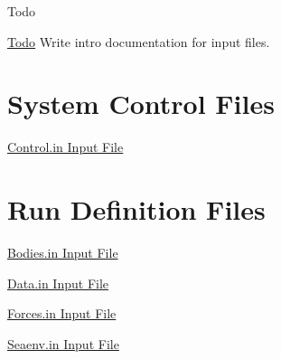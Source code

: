 \begin{DoxyRefDesc}{Todo}
\item[\hyperlink{todo__todo000012}{Todo}]Write intro documentation for input files.\end{DoxyRefDesc}


\section*{System Control Files}

\hyperlink{in_control}{Control.\-in Input File}

\section*{Run Definition Files}

\hyperlink{in_bodies}{Bodies.\-in Input File}

\hyperlink{in_data}{Data.\-in Input File}

\hyperlink{in_forces}{Forces.\-in Input File}

\hyperlink{in_seaenv}{Seaenv.\-in Input File}


